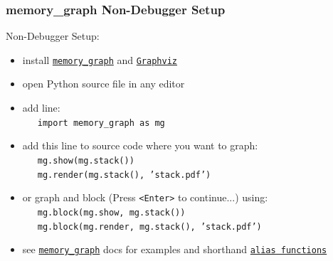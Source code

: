 \documentclass[10pt, colorlinks=true, urlcolor=blue]{beamer}
\begin{document}
\begin{frame}[fragile]\frametitle{memory\_graph Non-Debugger Setup}
  Non-Debugger Setup:
  \begin{itemize}
  \item install \href{https://pypi.org/project/memory-graph/}{\texttt{memory\_graph}} and \href{https://graphviz.org/download/}{\texttt{Graphviz}}
  \item open Python source file in any editor
  \item add line: \\ \ \ \ {\footnotesize \texttt{import memory_graph as mg}}
  \item add this line to source code where you want to graph: \\
    \ \ \ {\footnotesize \texttt{mg.show(mg.stack())}}\\
    \ \ \ {\footnotesize \texttt{mg.render(mg.stack(), 'stack.pdf')}}\\
  \item or graph and block (Press \texttt{<Enter>} to continue...) using: \\
    \ \ \ {\footnotesize \texttt{mg.block(mg.show, mg.stack())}}\\
    \ \ \ {\footnotesize \texttt{mg.block(mg.render, mg.stack(), 'stack.pdf')}}\\
  \item see \href{https://pypi.org/project/memory-graph/}{\texttt{memory\_graph}} docs for examples and shorthand \href{https://github.com/bterwijn/memory_graph?tab=readme-ov-file#debugging-without-debugger-tool}{\texttt{alias functions}}
  \end{itemize}
\end{frame}
\end{document}
